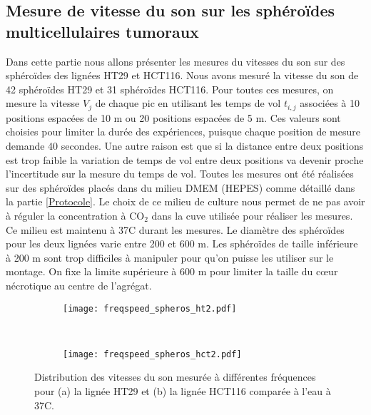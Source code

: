 \subsection{Mesure de vitesse du son sur les sphéroïdes multicellulaires  tumoraux}
Dans cette partie nous allons présenter les mesures du vitesses du son sur des sphéroïdes des lignées HT29 et HCT116. Nous avons mesuré la vitesse du son de 42 sphéroïdes HT29 et 31 sphéroïdes HCT116. Pour toutes ces mesures, on mesure la vitesse $V_j$ de chaque pic en utilisant les temps de vol $t_{i,j}$  associées à 10 positions espacées de 10 \textmu m ou 20 positions espacées de 5 \textmu m. Ces valeurs sont choisies pour limiter la durée des expériences, puisque chaque position de mesure demande 40 secondes. Une autre raison est que si la distance entre deux positions est trop faible la variation de temps de vol entre deux positions va devenir proche l'incertitude sur la mesure du temps de vol. Toutes les mesures ont été réalisées sur des sphéroïdes placés dans du milieu DMEM (HEPES) comme détaillé dans la partie \ref{Protocole}. Le choix de ce milieu de culture nous permet de ne pas avoir à réguler la concentration  à CO$_2$ dans la cuve utilisée pour réaliser les mesures. Ce milieu est maintenu à  37\textdegree C durant les mesures. Le diamètre des sphéroïdes pour les deux lignées varie entre 200 et 600 \textmu m. Les sphéroïdes de taille inférieure à 200 \textmu m sont trop difficiles à manipuler pour qu'on puisse les utiliser sur le montage. On fixe la limite supérieure à 600 \textmu m  pour limiter la taille du cœur nécrotique au centre de l'agrégat.\cite{Hamilton1998}
\begin{figure} [ht!]
\begin{subfigure}[t]{0.49\textwidth}
\texttt{[image: freqspeed\_spheros\_ht2.pdf]}
\caption{ \label{freqspeed_spheros_ht}}
\end{subfigure}
~~
\begin{subfigure}[t]{0.49\textwidth}
\texttt{[image: freqspeed\_spheros\_hct2.pdf]}
\caption{ \label{freqspeed_spheros_hct}}
\end{subfigure}
\caption{Distribution des vitesses du son mesurée à différentes fréquences  pour (a) la lignée HT29 et (b) la lignée HCT116 comparée à  l'eau à 37\textdegree C. }
\end{figure}

